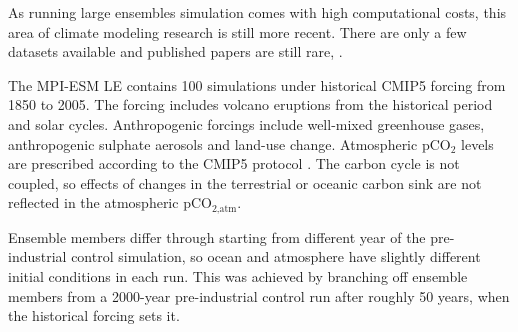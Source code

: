 As running large ensembles simulation comes with high computational costs, this area of climate modeling research is still more recent. There are only a few datasets available and published papers are still rare, \eg \cite{Deser2012,Thompson2015,Lovenduski2016,Krumhardt2017, Kay2015,McKinley2016,ilyinaletter2016,Bittner2016,Hedemann2017,Rodgers2015}.\newline 

The \acs{MPI-ESM LE} contains 100 simulations under historical \acs{CMIP5} forcing from 1850 to 2005. %
The forcing includes volcano eruptions from the historical period and solar cycles. Anthropogenic forcings include well-mixed greenhouse gases, anthropogenic sulphate aerosols and land-use change. Atmospheric pCO$_2$ levels are prescribed according to the \acs{CMIP5} protocol \citep{Taylor2012}. The carbon cycle is not coupled, so effects of changes in the terrestrial or oceanic carbon sink are not reflected in the atmospheric pCO$_{\text{2,atm}}$. 

Ensemble members differ through starting from different year of the pre-industrial control simulation, so ocean and atmosphere have slightly different initial conditions in each run. This was achieved by branching off ensemble members from a 2000-year pre-industrial control run after roughly 50 years, when the historical forcing sets it.\newline %

 





